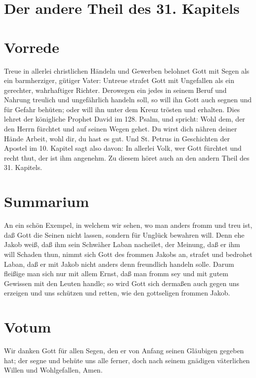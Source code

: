 \section{Der andere Theil des 31. Kapitels}

\section{Vorrede}

Treue in allerlei christlichen Händeln und Gewerben belohnet Gott mit Segen als ein barmherziger, gütiger Vater: Untreue strafet Gott mit Ungefallen als ein gerechter, wahrhaftiger Richter. Derowegen ein jedes in seinem Beruf und Nahrung treulich und ungefährlich handeln soll, so will ihn Gott auch segnen und für Gefahr behüten; oder will ihn unter dem Kreuz trösten und erhalten. Dies lehret der königliche Prophet David im 128. Psalm, und spricht: Wohl dem, der den Herrn fürchtet und auf seinen Wegen gehet. Du wirst dich nähren deiner Hände Arbeit, wohl dir, du hast es gut. Und St. Petrus in Geschichten der Apostel im 10. Kapitel sagt also davon: In allerlei Volk, wer Gott fürchtet und recht thut, der ist ihm angenehm. Zu diesem höret auch an den andern Theil des 31. Kapitels.

\section{Summarium}

An ein schön Exempel, in welchem wir sehen, wo man anders fromm und treu ist, daß Gott die Seinen nicht lassen, sondern für Unglück bewahren will. Denn ehe Jakob weiß, daß ihm sein Schwäher Laban nacheilet, der Meinung, daß er ihm will Schaden thun, nimmt sich Gott des frommen Jakobs an, strafet und bedrohet Laban, daß er mit Jakob nicht anders denn freundlich handeln solle. Darum fleißige man sich nur mit allem Ernst, daß man fromm sey und mit gutem Gewissen mit den Leuten handle; so wird Gott sich dermaßen auch gegen uns erzeigen und uns schützen und retten, wie den gottseligen frommen Jakob.

\section{Votum}

Wir danken Gott für allen Segen, den er von Anfang seinen Gläubigen gegeben hat; der segne und behüte uns alle ferner, doch nach seinem gnädigen väterlichen Willen und Wohlgefallen, Amen.

